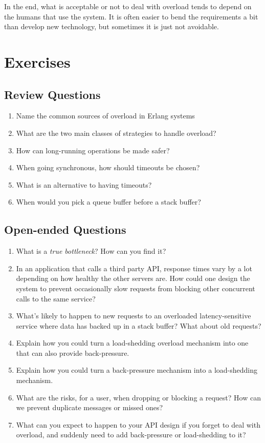 \documentclass[11pt, oneside]{book}   	%
\begin{document}
In the end, what is acceptable or not to deal with overload tends to depend on the humans that use the system. It is often easier to bend the requirements a bit than develop new technology, but sometimes it is just not avoidable.


\section{Exercises}

\subsection{Review Questions}

\begin{enumerate}
	\item Name the common sources of overload in Erlang systems
	\item What are the two main classes of strategies to handle overload?
	\item How can long-running operations be made safer?
	\item When going synchronous, how should timeouts be chosen?
	\item What is an alternative to having timeouts?
	\item When would you pick a queue buffer before a stack buffer?
\end{enumerate}

\subsection{Open-ended Questions}

\begin{enumerate}
	\item What is a \emph{true bottleneck}? How can you find it?
	\item In an application that calls a third party API, response times vary by a lot depending on how healthy the other servers are. How could one design the system to prevent occasionally slow requests from blocking other concurrent calls to the same service?
	\item What's likely to happen to new requests to an overloaded latency-sensitive service where data has backed up in a stack buffer? What about old requests?
	\item Explain how you could turn a load-shedding overload mechanism into one that can also provide back-pressure.
	\item Explain how you could turn a back-pressure mechanism into a load-shedding mechanism. 
	\item What are the risks, for a user, when dropping or blocking a request? How can we prevent duplicate messages or missed ones?
	\item What can you expect to happen to your API design if you forget to deal with overload, and suddenly need to add back-pressure or load-shedding to it?
\end{enumerate}
\end{document}
